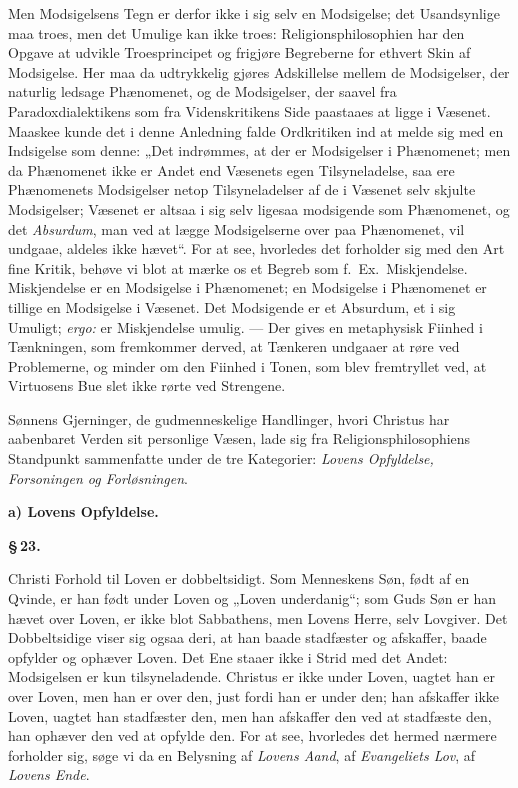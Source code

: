 \documentclass[12pt]{book}
\newcommand{\parmark}[1]{\begin{center}{\bfseries \S\,#1.}\end{center}}
\newcommand{\runhead}[1]{%
  \medskip\begin{center}{\bfseries #1}\end{center}\medskip}
\begin{document}
Men Modsigelsens Tegn er derfor ikke i sig selv en Modsigelse; det
Usandsynlige maa troes, men det Umulige kan ikke troes:
Religionsphilosophien har den Opgave at udvikle Troesprincipet og
frigjøre Begreberne for ethvert Skin af Modsigelse. Her maa da
udtrykkelig gjøres Adskillelse mellem de Modsigelser, der naturlig
ledsage
Phænomenet, og de Modsigelser, der saavel fra Paradoxdialektikens
som fra Videnskritikens Side paastaaes at ligge i Væsenet. Maaskee
kunde det i denne Anledning falde Ordkritiken ind at melde sig med
en Indsigelse som denne: „Det indrømmes, at der er Modsigelser i
Phænomenet; men da Phænomenet ikke er Andet end Væsenets egen
Tilsyneladelse, saa ere Phænomenets Modsigelser netop
Tilsyneladelser af de i Væsenet selv skjulte Modsigelser; Væsenet er
altsaa i sig selv ligesaa modsigende som Phænomenet, og det
\emph{Absurdum}, man ved at lægge Modsigelserne over paa
Phænomenet, vil undgaae, aldeles ikke hævet“.
For at see,
hvorledes det forholder sig med den Art fine Kritik, behøve vi blot
at mærke os et Begreb som f.\ Ex.\ Miskjendelse. Miskjendelse er en
Modsigelse i Phænomenet; en Modsigelse i Phænomenet er tillige en
Modsigelse i Væsenet. Det Modsigende er et Absurdum, et i sig
Umuligt; \textit{ergo:} er Miskjendelse umulig. --- Der gives en
metaphysisk Fiinhed i Tænkningen, som fremkommer derved, at Tænkeren
undgaaer at røre ved Problemerne, og minder om den Fiinhed i Tonen,
som blev fremtryllet ved, at Virtuosens Bue slet ikke rørte ved
Strengene.

Sønnens Gjerninger, de gudmenneskelige Handlinger, hvori Christus
har aabenbaret Verden sit personlige Væsen, lade sig fra
Religionsphilosophiens Standpunkt sammenfatte under de tre
Kategorier: \emph{Lovens Opfyldelse, Forsoningen og Forløsningen}.

\runhead{a) Lovens Opfyldelse.}
\parmark{23}

Christi Forhold til Loven er dobbeltsidigt. Som Menneskens Søn, født
af en Qvinde, er han født under Loven og „Loven underdanig“; som
Guds Søn er han
hævet over Loven, er ikke blot Sabbathens, men Lovens Herre, selv
Lovgiver. Det Dobbeltsidige viser sig ogsaa deri, at han baade
stadfæster og afskaffer, baade opfylder og ophæver Loven. Det Ene
staaer ikke i Strid med det Andet: Modsigelsen er kun tilsyneladende.
Christus er ikke under Loven, uagtet han er over Loven, men han er
over den, just fordi han er under den; han afskaffer ikke Loven,
uagtet han stadfæster den, men han afskaffer den ved at stadfæste
den, han ophæver den ved at opfylde den. For at see, hvorledes det
hermed nærmere forholder sig, søge vi da en Belysning af
\emph{Lovens Aand}, af \emph{Evangeliets Lov}, af \emph{Lovens
Ende}.
\end{document}
